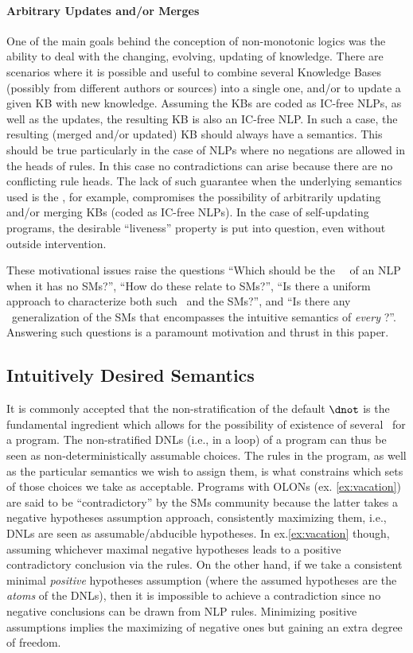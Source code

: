\documentclass{llncs}
\begin{document}
		\paragraph{{\bf Arbitrary Updates and/or Merges}}\label{subsec:allowingArbitraryUpdatesMerges}
			One of the main goals behind the conception of non-monotonic logics was the ability to deal with the changing, evolving, updating of 
			knowledge.
			There are scenarios where it is possible and useful to combine several Knowledge Bases (possibly from different authors or sources) into a 
			single one, and/or to update a given KB with new knowledge. Assuming the KBs are coded as IC-free NLPs, as well as the updates, the resulting KB is also an IC-free NLP.
			In such a case, the resulting (merged and/or updated) KB should always have a semantics.
			This should be true particularly in the case of NLPs where no negations are allowed in the heads of rules.
			In this case no contradictions can arise because there are no conflicting rule heads.
			The lack of such guarantee when the underlying semantics used is the \SMs, for example, compromises the possibility of arbitrarily
			updating and/or merging KBs (coded as IC-free NLPs).
			In the case of self-updating programs, the desirable ``liveness'' property is put into question, even without outside intervention.
	
			These motivational issues raise the questions
``Which should be the \twov\ \ms\ of an NLP when it has no SMs?'',
			``How do these relate to SMs?'',
			``Is there a uniform approach to characterize both such \ms\ and the SMs?'', and 
			``Is there any \twov\ generalization of the SMs that encompasses the intuitive semantics of \emph{every} \lp?''.
			Answering such questions is a paramount motivation and thrust in this paper.
		\subsection{Intuitively Desired Semantics}\label{subsec:intuitivelydesired}
			It is commonly accepted that the non-stratification of the default $\dnot$ is the fundamental ingredient which allows for the possibility of 
			existence of several \ms\ for a program. The non-stratified DNLs (i.e., in a loop) of a program can thus be seen as non-deterministically assumable choices.
			The rules in the program, as well as the particular semantics we wish to assign them, is what constrains which sets of those choices
			we take as acceptable.
			Programs with OLONs (ex. \ref{ex:vacation}) are said to be
			``contradictory'' by the SMs community because the latter takes a negative hypotheses assumption approach,
			consistently maximizing them,
			i.e., DNLs are seen as assumable/abducible hypotheses.
			In ex.\ref{ex:vacation} though, assuming whichever maximal negative hypotheses leads to a positive contradictory
			conclusion via the rules.
			On the other hand, if we take a consistent minimal \emph{positive} hypotheses assumption (where the assumed
			hypotheses are the \emph{atoms} of the DNLs), then it is impossible to achieve a
			contradiction since no negative conclusions can be drawn from NLP rules.
			Minimizing positive assumptions implies the maximizing of negative ones but gaining an extra degree of freedom.
\end{document}

